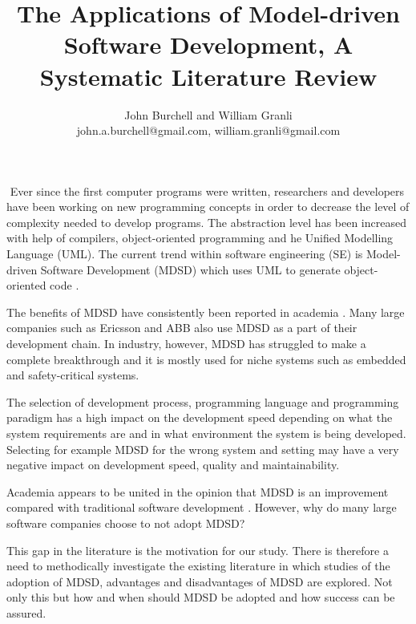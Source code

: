 \documentclass[10pt,twocolumn]{article}
\begin{document}
\title{The Applications of Model-driven Software Development, A Systematic Literature Review}

\author{John Burchell and William Granli \\
john.a.burchell@gmail.com, william.granli@gmail.com}


\maketitle
\thispagestyle{empty}




​
Ever since the first computer programs were written, researchers and developers have been working on new programming concepts in order to decrease the level of complexity needed to develop programs. The abstraction level has been increased with help of compilers, object-oriented programming and he Unified Modelling Language (UML). The current trend within software engineering (SE) is Model-driven Software Development (MDSD) which uses UML to generate object-oriented code \cite{staron2006adopting}. 

The benefits of MDSD have consistently been reported in academia \cite{staron2006adopting} \cite{volter2013model}. Many large companies such as Ericsson and ABB \cite{staron2006adopting} also use MDSD as a part of their development chain. In industry, however, MDSD has struggled to make a complete breakthrough and it is mostly used for niche systems such as embedded and safety-critical systems.

The selection of development process, programming language and programming paradigm has a high impact on the development speed depending on what the system requirements are and in what environment the system is being developed. Selecting for example MDSD for the wrong system and setting may have a very negative impact on development speed, quality and maintainability. 

Academia appears to be united in the opinion that MDSD is an improvement compared with traditional software development \cite{staron2006adopting} \cite{volter2013model}. However, why do many large software companies choose to not adopt MDSD?

This gap in the literature is the motivation for our study. There is therefore a need to methodically investigate the existing literature in which studies of the adoption of MDSD, advantages and disadvantages of MDSD are explored. Not only this but how and when should MDSD be adopted and how success can be assured.
\end{document}
